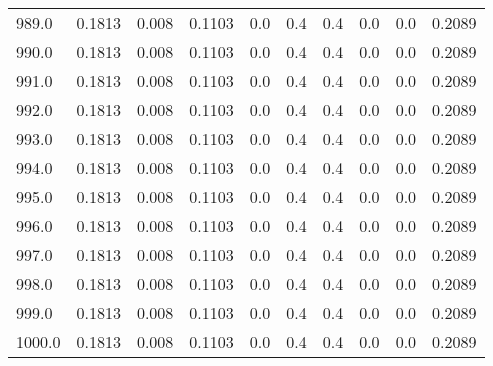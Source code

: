 \begin{longtable}{lrrrrrrrrr}
989.0 & 0.1813 & 0.008 & 0.1103 & 0.0 & 0.4 & 0.4 & 0.0 & 0.0 & 0.2089 \\
990.0 & 0.1813 & 0.008 & 0.1103 & 0.0 & 0.4 & 0.4 & 0.0 & 0.0 & 0.2089 \\
991.0 & 0.1813 & 0.008 & 0.1103 & 0.0 & 0.4 & 0.4 & 0.0 & 0.0 & 0.2089 \\
992.0 & 0.1813 & 0.008 & 0.1103 & 0.0 & 0.4 & 0.4 & 0.0 & 0.0 & 0.2089 \\
993.0 & 0.1813 & 0.008 & 0.1103 & 0.0 & 0.4 & 0.4 & 0.0 & 0.0 & 0.2089 \\
994.0 & 0.1813 & 0.008 & 0.1103 & 0.0 & 0.4 & 0.4 & 0.0 & 0.0 & 0.2089 \\
995.0 & 0.1813 & 0.008 & 0.1103 & 0.0 & 0.4 & 0.4 & 0.0 & 0.0 & 0.2089 \\
996.0 & 0.1813 & 0.008 & 0.1103 & 0.0 & 0.4 & 0.4 & 0.0 & 0.0 & 0.2089 \\
997.0 & 0.1813 & 0.008 & 0.1103 & 0.0 & 0.4 & 0.4 & 0.0 & 0.0 & 0.2089 \\
998.0 & 0.1813 & 0.008 & 0.1103 & 0.0 & 0.4 & 0.4 & 0.0 & 0.0 & 0.2089 \\
999.0 & 0.1813 & 0.008 & 0.1103 & 0.0 & 0.4 & 0.4 & 0.0 & 0.0 & 0.2089 \\
1000.0 & 0.1813 & 0.008 & 0.1103 & 0.0 & 0.4 & 0.4 & 0.0 & 0.0 & 0.2089 \\
\end{longtable}